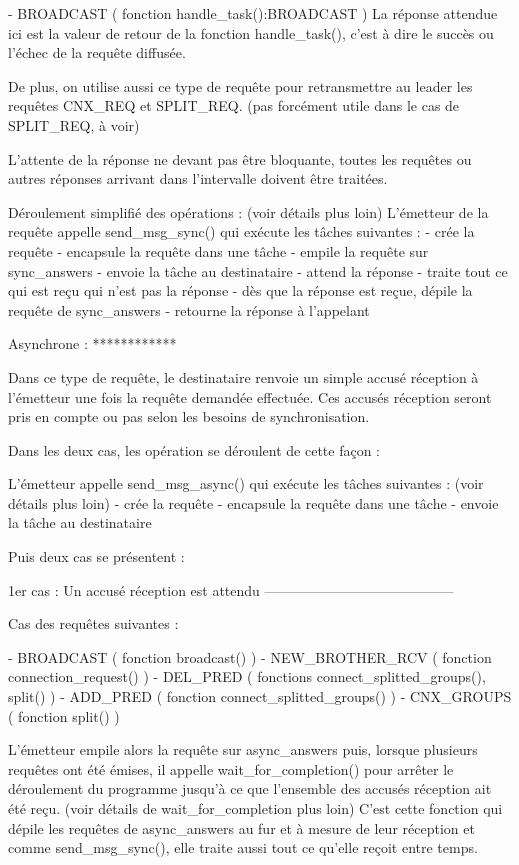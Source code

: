 - BROADCAST ( fonction handle_task():BROADCAST )
  La réponse attendue ici est la valeur de retour de la fonction handle_task(), c'est à dire le succès
  ou l'échec de la requête diffusée.

De plus, on utilise aussi ce type de requête pour retransmettre au leader les requêtes CNX_REQ et
SPLIT_REQ. (pas forcément utile dans le cas de SPLIT_REQ, à voir)

L'attente de la réponse ne devant pas être bloquante, toutes les requêtes ou autres réponses
arrivant dans l'intervalle doivent être traitées.

Déroulement simplifié des opérations : (voir détails plus loin)
L'émetteur de la requête appelle send_msg_sync() qui exécute les tâches suivantes :
- crée la requête
- encapsule la requête dans une tâche
- empile la requête sur sync_answers
- envoie la tâche au destinataire
- attend la réponse
- traite tout ce qui est reçu qui n'est pas la réponse
- dès que la réponse est reçue, dépile la requête de sync_answers
- retourne la réponse à l'appelant


Asynchrone :
************

Dans ce type de requête, le destinataire renvoie un simple accusé réception à l'émetteur une fois la
requête demandée effectuée. Ces accusés réception seront pris en compte ou pas selon les besoins de
synchronisation.

Dans les deux cas, les opération se déroulent de cette façon :

L'émetteur appelle send_msg_async() qui exécute les tâches suivantes : (voir détails plus loin)
- crée la requête
- encapsule la requête dans une tâche
- envoie la tâche au destinataire

Puis deux cas se présentent :

1er cas : Un accusé réception est attendu
-----------------------------------------

Cas des requêtes suivantes :

- BROADCAST ( fonction broadcast() )
- NEW_BROTHER_RCV ( fonction connection_request() )
- DEL_PRED ( fonctions connect_splitted_groups(), split() )
- ADD_PRED ( fonction connect_splitted_groups() )
- CNX_GROUPS ( fonction split() )

L'émetteur empile alors la requête sur async_answers puis, lorsque plusieurs requêtes ont été émises,
il appelle wait_for_completion() pour arrêter le déroulement du programme jusqu'à ce que l'ensemble
des accusés réception ait été reçu. (voir détails de wait_for_completion plus loin)
C'est cette fonction qui dépile les requêtes de async_answers au fur et à mesure de leur réception
et comme send_msg_sync(), elle traite aussi tout ce qu'elle reçoit entre temps.


